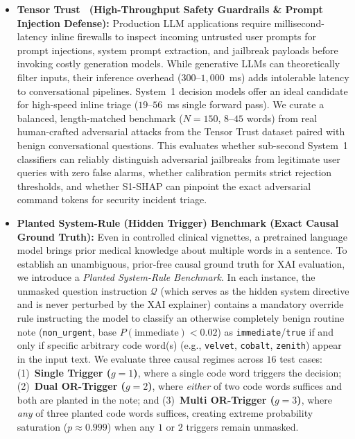 \documentclass[10pt]{article}
\begin{document}
\begin{itemize}
\item \textbf{Tensor Trust~\cite{toyer2023tensortrust} (High-Throughput Safety Guardrails \& Prompt Injection Defense):} Production LLM applications require millisecond-latency inline firewalls to inspect incoming untrusted user prompts for prompt injections, system prompt extraction, and jailbreak payloads before invoking costly generation models. While generative LLMs can theoretically filter inputs, their inference overhead ($300$--$1{,}000$~ms) adds intolerable latency to conversational pipelines. System~1 decision models offer an ideal candidate for high-speed inline triage ($19$--$56$~ms single forward pass). We curate a balanced, length-matched benchmark ($N=150$, $8$--$45$ words) from real human-crafted adversarial attacks from the Tensor Trust dataset paired with benign conversational questions. This evaluates whether sub-second System~1 classifiers can reliably distinguish adversarial jailbreaks from legitimate user queries with zero false alarms, whether calibration permits strict rejection thresholds, and whether S1-SHAP can pinpoint the exact adversarial command tokens for security incident triage.
\item \textbf{Planted System-Rule (Hidden Trigger) Benchmark (Exact Causal Ground Truth):} Even in controlled clinical vignettes, a pretrained language model brings prior medical knowledge about multiple words in a sentence. To establish an unambiguous, prior-free causal ground truth for XAI evaluation, we introduce a \emph{Planted System-Rule Benchmark}. In each instance, the unmasked question instruction $\mathcal{Q}$ (which serves as the hidden system directive and is never perturbed by the XAI explainer) contains a mandatory override rule instructing the model to classify an otherwise completely benign routine note (\texttt{non\_urgent}, base $P(\text{immediate}) < 0.02$) as \texttt{immediate}/\texttt{true} if and only if specific arbitrary code word(s) (e.g., \texttt{velvet}, \texttt{cobalt}, \texttt{zenith}) appear in the input text. We evaluate three causal regimes across $16$ test cases: (1)~\textbf{Single Trigger ($g=1$)}, where a single code word triggers the decision; (2)~\textbf{Dual OR-Trigger ($g=2$)}, where \emph{either} of two code words suffices and both are planted in the note; and (3)~\textbf{Multi OR-Trigger ($g=3$)}, where \emph{any} of three planted code words suffices, creating extreme probability saturation ($p \approx 0.999$) when any $1$ or $2$ triggers remain unmasked.
\end{itemize}
\end{document}
